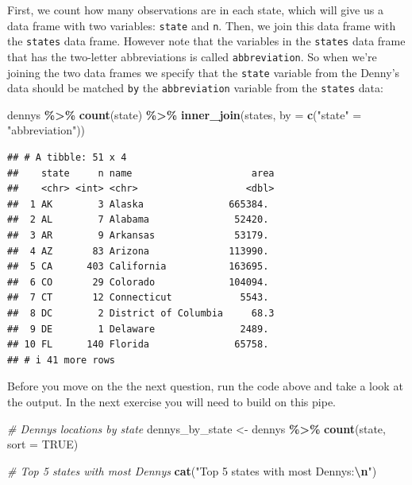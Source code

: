 \documentclass[
]{article}
\newenvironment{Shaded}{\begin{snugshade}}{\end{snugshade}}
\newcommand{\AttributeTok}[1]{\textcolor[rgb]{0.13,0.29,0.53}{#1}}
\newcommand{\CommentTok}[1]{\textcolor[rgb]{0.56,0.35,0.01}{\textit{#1}}}
\newcommand{\ConstantTok}[1]{\textcolor[rgb]{0.56,0.35,0.01}{#1}}
\newcommand{\FunctionTok}[1]{\textcolor[rgb]{0.13,0.29,0.53}{\textbf{#1}}}
\newcommand{\NormalTok}[1]{#1}
\newcommand{\OtherTok}[1]{\textcolor[rgb]{0.56,0.35,0.01}{#1}}
\newcommand{\SpecialCharTok}[1]{\textcolor[rgb]{0.81,0.36,0.00}{\textbf{#1}}}
\newcommand{\StringTok}[1]{\textcolor[rgb]{0.31,0.60,0.02}{#1}}
\begin{document}
First, we count how many observations are in each state, which will give
us a data frame with two variables: \texttt{state} and \texttt{n}. Then,
we join this data frame with the \texttt{states} data frame. However
note that the variables in the \texttt{states} data frame that has the
two-letter abbreviations is called \texttt{abbreviation}. So when we're
joining the two data frames we specify that the \texttt{state} variable
from the Denny's data should be matched \texttt{by} the
\texttt{abbreviation} variable from the \texttt{states} data:

\begin{Shaded}
\begin{Highlighting}[]
\NormalTok{dennys }\SpecialCharTok{\%\textgreater{}\%}
  \FunctionTok{count}\NormalTok{(state) }\SpecialCharTok{\%\textgreater{}\%}
  \FunctionTok{inner\_join}\NormalTok{(states, }\AttributeTok{by =} \FunctionTok{c}\NormalTok{(}\StringTok{"state"} \OtherTok{=} \StringTok{"abbreviation"}\NormalTok{))}
\end{Highlighting}
\end{Shaded}

\begin{verbatim}
## # A tibble: 51 x 4
##    state     n name                     area
##    <chr> <int> <chr>                   <dbl>
##  1 AK        3 Alaska               665384. 
##  2 AL        7 Alabama               52420. 
##  3 AR        9 Arkansas              53179. 
##  4 AZ       83 Arizona              113990. 
##  5 CA      403 California           163695. 
##  6 CO       29 Colorado             104094. 
##  7 CT       12 Connecticut            5543. 
##  8 DC        2 District of Columbia     68.3
##  9 DE        1 Delaware               2489. 
## 10 FL      140 Florida               65758. 
## # i 41 more rows
\end{verbatim}

Before you move on the the next question, run the code above and take a
look at the output. In the next exercise you will need to build on this
pipe.

\begin{Shaded}
\begin{Highlighting}[]
\CommentTok{\# Denny\textquotesingle{}s locations by state}
\NormalTok{dennys\_by\_state }\OtherTok{\textless{}{-}}\NormalTok{ dennys }\SpecialCharTok{\%\textgreater{}\%}
  \FunctionTok{count}\NormalTok{(state, }\AttributeTok{sort =} \ConstantTok{TRUE}\NormalTok{)}

\CommentTok{\# Top 5 states with most Denny\textquotesingle{}s}
\FunctionTok{cat}\NormalTok{(}\StringTok{"Top 5 states with most Denny\textquotesingle{}s:}\SpecialCharTok{\textbackslash{}n}\StringTok{"}\NormalTok{)}
\end{Highlighting}
\end{Shaded}
\end{document}
